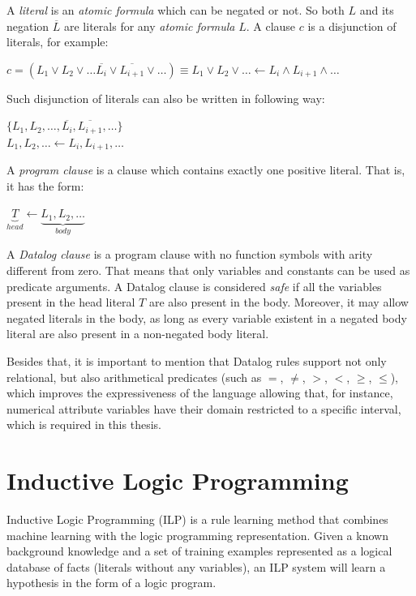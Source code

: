 A \emph{literal} is an \emph{atomic formula} which can be negated or not. So both $L$ and its negation $\overline{L}$
are literals for any \emph{atomic formula} $L$. A clause $c$ is a disjunction of literals, for example:
\begin{center}
  $c=(L_1 \vee L_2 \vee \ldots \overline{L_{i}} \vee \overline{L_{i+1}} \vee \ldots) \equiv
 L_1 \vee L_2 \vee \ldots \leftarrow L_i \wedge L_{i+1} \wedge \ldots$
\end{center}

Such disjunction of literals can also be written in following way:
\begin{center}
 $\{L_1,L_2,\ldots,\overline{L_i},\overline{L_{i+1}},\ldots\}$ \\
$ L_1,L_2,\ldots \leftarrow L_i,L_{i+1},\ldots$
\end{center}

A \emph{program clause} is a clause which contains exactly one positive literal. That is, it has the form:
\begin{center}
 $\underbrace{T}_{head} \leftarrow \underbrace{L_1,L_2,\ldots}_{body}$
\end{center}

A \emph{Datalog clause} is a program clause with no function symbols with arity different from zero. That
means that only variables and constants can be used as predicate arguments. A Datalog clause is considered \emph{safe}
if all the variables present in the head literal $T$ are also present in the body. Moreover, it may allow negated
literals in the body, as long as every variable existent in a negated body literal are also present in a
non-negated body literal.

Besides that, it is important to mention that Datalog rules support not only relational, but also
arithmetical predicates (such as $=$, $\neq$, $>$, $<$, $\geq$, $\leq$), which improves the expressiveness of the
language allowing that, for instance, numerical attribute variables have their domain restricted to a specific
interval, which is required in this thesis.

\section{Inductive Logic Programming}
\label{sec:rw-ilp}

Inductive Logic Programming (ILP) is a rule learning method that combines machine learning with the
logic programming representation. Given a known background knowledge and a set of training examples represented as a
logical database of facts (literals without any variables), an ILP system will learn a hypothesis in the form of a
logic program.

